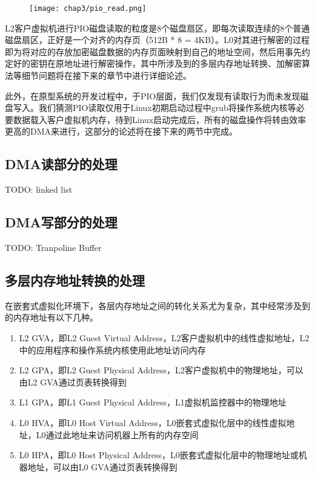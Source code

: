 \begin{figure}[!htbp]
  \centering
  \texttt{[image: chap3/pio\_read.png]}
\end{figure}

L2客户虚拟机进行PIO磁盘读取的粒度是8个磁盘扇区，即每次读取连续的8个普通磁盘扇区，正好是一个对齐的内存页（512B * 8 = 4KB）。L0对其进行解密的过程即为将对应的存放加密磁盘数据的内存页面映射到自己的地址空间，然后用事先约定好的密钥在原地址进行解密操作，其中所涉及到的多层内存地址转换、加解密算法等细节问题将在接下来的章节中进行详细论述。

此外，在原型系统的开发过程中，于PIO层面，我们仅发现有读取行为而未发现磁盘写入。我们猜测PIO读取仅用于Linux初期启动过程中grub将操作系统内核等必要数据载入客户虚拟机内存，待到Linux启动完成后，所有的磁盘操作将转由效率更高的DMA来进行，这部分的论述将在接下来的两节中完成。

\subsection{DMA读部分的处理}

TODO: linked list

\subsection{DMA写部分的处理}

TODO: Tranpoline Buffer

\subsection{多层内存地址转换的处理}

在嵌套式虚拟化环境下，各层内存地址之间的转化关系尤为复杂，其中经常涉及到的内存地址有以下几种。

\begin{enumerate}
\item L2 GVA，即L2 Guest Virtual Address，L2客户虚拟机中的线性虚拟地址，L2中的应用程序和操作系统内核使用此地址访问内存
\item L2 GPA，即L2 Guest Physical Address，L2客户虚拟机中的物理地址，可以由L2 GVA通过页表转换得到
\item L1 GPA，即L1 Guest Physical Address，L1虚拟机监控器中的物理地址
\item L0 HVA，即L0 Host Virtual Address，L0嵌套式虚拟化层中的线性虚拟地址，L0通过此地址来访问机器上所有的内存空间
\item L0 HPA，即L0 Host Physical Address，L0嵌套式虚拟化层中的物理地址或机器地址，可以由L0 GVA通过页表转换得到
\end{enumerate}

